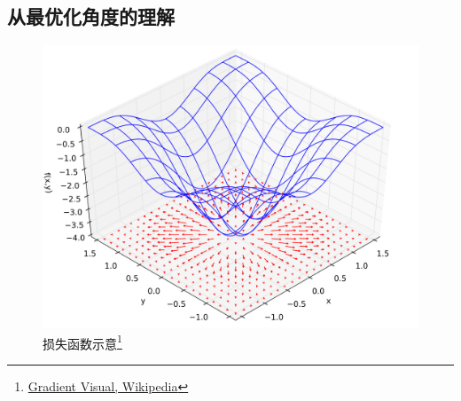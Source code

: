 \subsection{从最优化角度的理解}
\begin{frame}
    \begin{figure}[!tb]
        \includegraphics[width=\onepicwidth]{figure/gbdt/Gradient_Visual}
        \caption{损失函数示意\footnote{
                 \href{https://en.wikipedia.org/wiki/File:Gradient_Visual.svg}{Gradient Visual, Wikipedia}}}
    \end{figure}
\end{frame}

\begin{frame}
    \begin{figure}
        \centering
        \subfigure[][]{
            \resizebox{0.53\linewidth}{!}{}
        }
        \hfil
        \subfigure[][]{
            \resizebox{0.40\linewidth}{!}{}
        }
    \end{figure}
\end{frame}

\begin{frame}
    \begin{figure}
        \centering
        \resizebox{1.1\onepicwidth}{!}{}
    \end{figure}
\end{frame}



